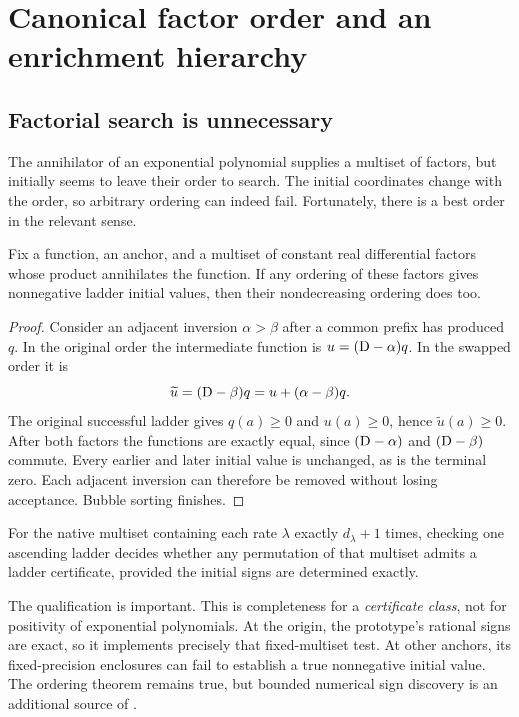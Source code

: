 \section{Canonical factor order and an enrichment hierarchy}
\label{sec:enrichment}

\subsection{Factorial search is unnecessary}

The annihilator of an exponential polynomial supplies a multiset of factors,
but initially seems to leave their order to search. The initial coordinates
change with the order, so arbitrary ordering can indeed fail. Fortunately,
there is a best order in the relevant sense.

\begin{theorem}
\label{thm:order}
Fix a function, an anchor, and a multiset of constant real differential factors
whose product annihilates the function. If any ordering of these factors gives
nonnegative ladder initial values, then their nondecreasing ordering does too.
\end{theorem}
\begin{proof}
Consider an adjacent inversion $\alpha>\beta$ after a common prefix has produced
$q$. In the original order the intermediate function is
$u=(\mathrm D-\alpha)q$. In the swapped order it is
\[
 \widetilde u=(\mathrm D-\beta)q=u+(\alpha-\beta)q.
\]
The original successful ladder gives $q(a)\ge0$ and $u(a)\ge0$, hence
$\widetilde u(a)\ge0$. After both factors the functions are exactly equal,
since $(\mathrm D-\alpha)$ and $(\mathrm D-\beta)$ commute. Every earlier and later initial
value is unchanged, as is the terminal zero. Each adjacent inversion can
therefore be removed without losing acceptance. Bubble sorting finishes.
\end{proof}

\begin{corollary}
For the native multiset containing each rate $\lambda$ exactly $d_\lambda+1$
times, checking one ascending ladder decides whether any permutation of that
multiset admits a ladder certificate, provided the initial signs are determined
exactly.
\end{corollary}

The qualification is important. This is completeness for a \emph{certificate
class}, not for positivity of exponential polynomials. At the origin, the
prototype's rational signs are exact, so it implements precisely that
fixed-multiset test. At other anchors, its fixed-precision enclosures can fail
to establish a true nonnegative initial value. The ordering theorem remains
true, but bounded numerical sign discovery is an additional source of
\unknown{}.

